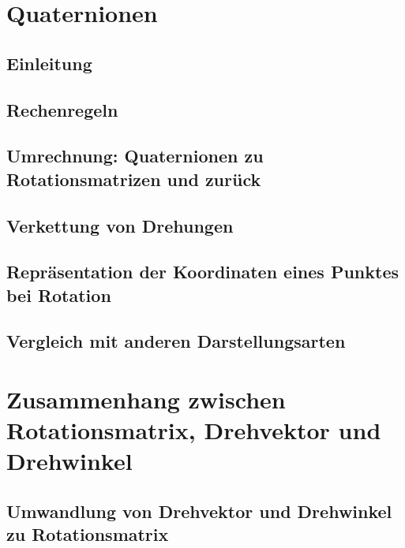 \chapter{Quaternionen} %

	\section{Einleitung} %

	\section{Rechenregeln} %

	\section{Umrechnung: Quaternionen zu Rotationsmatrizen und zurück} %

	\section{Verkettung von Drehungen} %

	\section{Repräsentation der Koordinaten eines Punktes bei Rotation} %

	\section{Vergleich mit anderen Darstellungsarten} %

\chapter{Zusammenhang zwischen Rotationsmatrix, Drehvektor und Drehwinkel} %

	\section{Umwandlung von Drehvektor und Drehwinkel zu Rotationsmatrix} %

